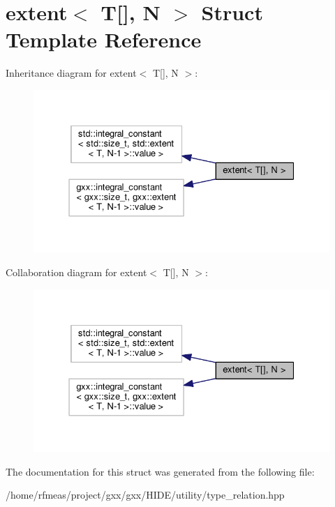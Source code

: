 \hypertarget{structextent_3_01T[]_00_01N_01_4}{}\section{extent$<$ T\mbox{[}\mbox{]}, N $>$ Struct Template Reference}
\label{structextent_3_01T[]_00_01N_01_4}


Inheritance diagram for extent$<$ T\mbox{[}\mbox{]}, N $>$\+:
\nopagebreak
\begin{figure}[H]
\begin{center}
\leavevmode
\includegraphics[width=331pt]{structextent_3_01T[]_00_01N_01_4__inherit__graph}
\end{center}
\end{figure}


Collaboration diagram for extent$<$ T\mbox{[}\mbox{]}, N $>$\+:
\nopagebreak
\begin{figure}[H]
\begin{center}
\leavevmode
\includegraphics[width=331pt]{structextent_3_01T[]_00_01N_01_4__coll__graph}
\end{center}
\end{figure}


The documentation for this struct was generated from the following file\+:\begin{DoxyCompactItemize}
\item 
/home/rfmeas/project/gxx/gxx/\+H\+I\+D\+E/utility/type\+\_\+relation.\+hpp\end{DoxyCompactItemize}
